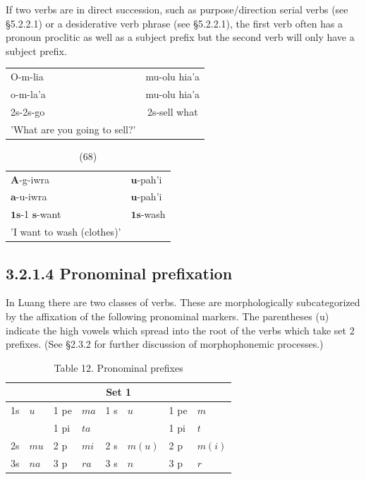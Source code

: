 \documentclass[10pt]{article}
\begin{document}
If two verbs are in direct succession, such as purpose/direction serial verbs (see §5.2.2.1) or a desiderative verb phrase (see §5.2.2.1), the first verb often has a pronoun proclitic as well as a subject prefix but the second verb will only have a subject prefix.

\begin{center}
\begin{tabular}{lc}
O-m-lia & mu-olu hia'a \\
o-m-la'a & mu-olu hia'a \\
2s-2s-go & 2s-sell what \\
'What are you going to sell?' &  \\
\end{tabular}
\end{center}

\begin{table}[h]
\begin{center}
\captionsetup{labelformat=empty}
\caption{(68)}
\begin{tabular}{ll}
\(\boldsymbol{A}\)-g-iwra & \(\boldsymbol{u}\)-pah'i \\
\(\boldsymbol{a}\)-u-iwra & \(\boldsymbol{u}\)-pah'i \\
\(\mathbf{1} \mathbf{s}\)-1 \(\mathbf{s}\)-want & \(\mathbf{1} \mathbf{s}\)-wash \\
'I want to wash (clothes)' &  \\
\end{tabular}
\end{center}
\end{table}

\subsection*{3.2.1.4 Pronominal prefixation}
In Luang there are two classes of verbs. These are morphologically subcategorized by the affixation of the following pronominal markers. The parentheses (u) indicate the high vowels which spread into the root of the verbs which take set 2 prefixes. (See §2.3.2 for further discussion of morphophonemic processes.)

\begin{table}[h]
\begin{center}
\captionsetup{labelformat=empty}
\caption{Table 12. Pronominal prefixes}
\begin{tabular}{|llll|llll|}
\multicolumn{8}{c}{Set 1} \\
\hline
1s & \(u\) & 1 pe & \(m a\) & 1 s & \(u\) & 1 pe & \(m\) \\
 &  & 1 pi & \(t a\) &  &  & 1 pi & \(t\) \\
2s & \(m u\) & 2 p & \(m i\) & 2 s & \(m(u)\) & 2 p & \(m(i)\) \\
3s & \(n a\) & 3 p & \(r a\) & 3 s & \(n\) & 3 p & \(r\) \\
\hline
\end{tabular}
\end{center}
\end{table}
\end{document}
